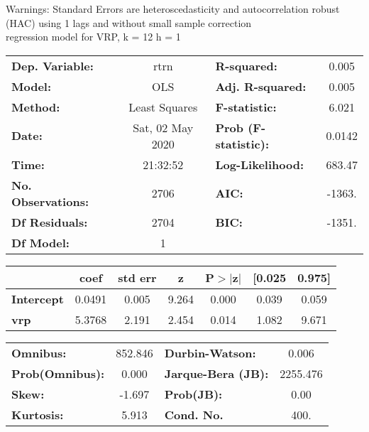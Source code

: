 Warnings: \newline
 [1] Standard Errors are heteroscedasticity and autocorrelation robust (HAC) using 1 lags and without small sample correction\\ 

regression model for VRP, k = 12 h = 1\begin{center}
\begin{tabular}{lclc}
\toprule
\textbf{Dep. Variable:}    &       rtrn       & \textbf{  R-squared:         } &     0.005   \\
\textbf{Model:}            &       OLS        & \textbf{  Adj. R-squared:    } &     0.005   \\
\textbf{Method:}           &  Least Squares   & \textbf{  F-statistic:       } &     6.021   \\
\textbf{Date:}             & Sat, 02 May 2020 & \textbf{  Prob (F-statistic):} &   0.0142    \\
\textbf{Time:}             &     21:32:52     & \textbf{  Log-Likelihood:    } &    683.47   \\
\textbf{No. Observations:} &        2706      & \textbf{  AIC:               } &    -1363.   \\
\textbf{Df Residuals:}     &        2704      & \textbf{  BIC:               } &    -1351.   \\
\textbf{Df Model:}         &           1      & \textbf{                     } &             \\
\bottomrule
\end{tabular}
\begin{tabular}{lcccccc}
                   & \textbf{coef} & \textbf{std err} & \textbf{z} & \textbf{P$> |$z$|$} & \textbf{[0.025} & \textbf{0.975]}  \\
\midrule
\textbf{Intercept} &       0.0491  &        0.005     &     9.264  &         0.000        &        0.039    &        0.059     \\
\textbf{vrp}       &       5.3768  &        2.191     &     2.454  &         0.014        &        1.082    &        9.671     \\
\bottomrule
\end{tabular}
\begin{tabular}{lclc}
\textbf{Omnibus:}       & 852.846 & \textbf{  Durbin-Watson:     } &    0.006  \\
\textbf{Prob(Omnibus):} &   0.000 & \textbf{  Jarque-Bera (JB):  } & 2255.476  \\
\textbf{Skew:}          &  -1.697 & \textbf{  Prob(JB):          } &     0.00  \\
\textbf{Kurtosis:}      &   5.913 & \textbf{  Cond. No.          } &     400.  \\
\bottomrule
\end{tabular}
\end{center}

